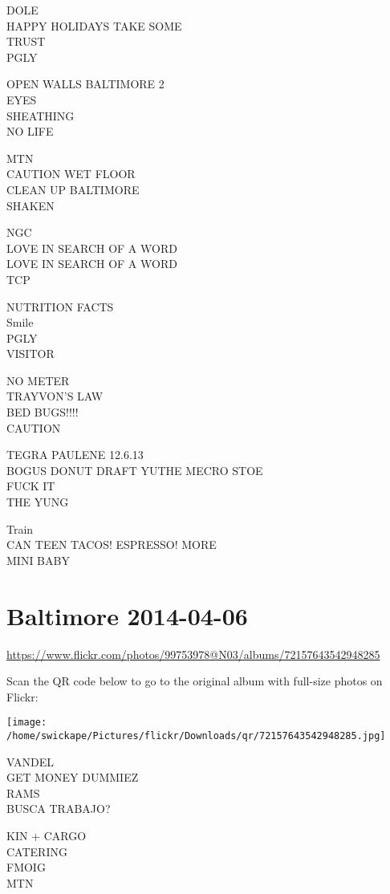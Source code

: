 \documentclass[10pt,letterpaper]{article}
\begin{document}
DOLE\\
HAPPY HOLIDAYS TAKE SOME\\
TRUST\\
PGLY

OPEN WALLS BALTIMORE 2\\
EYES\\
SHEATHING\\
NO LIFE

MTN\\
CAUTION WET FLOOR\\
CLEAN UP BALTIMORE\\
SHAKEN

NGC\\
LOVE IN SEARCH OF A WORD\\
LOVE IN SEARCH OF A WORD\\
TCP

NUTRITION FACTS\\
Smile\\
PGLY\\
VISITOR

NO METER\\
TRAYVON'S LAW\\
BED BUGS!!!!\\
CAUTION

TEGRA PAULENE 12.6.13\\
BOGUS DONUT DRAFT YUTHE MECRO STOE\\
FUCK IT\\
THE YUNG

Train\\
CAN TEEN TACOS! ESPRESSO! MORE\\
MINI BABY


\section*{Baltimore 2014-04-06}

\url{https://www.flickr.com/photos/99753978@N03/albums/72157643542948285}

Scan the QR code below to go to the original album with full-size photos on Flickr:

\texttt{[image: /home/swickape/Pictures/flickr/Downloads/qr/72157643542948285.jpg]}


VANDEL\\
GET MONEY DUMMIEZ\\
RAMS\\
BUSCA TRABAJO?

KIN + CARGO\\
CATERING\\
FMOIG\\
MTN
\end{document}
